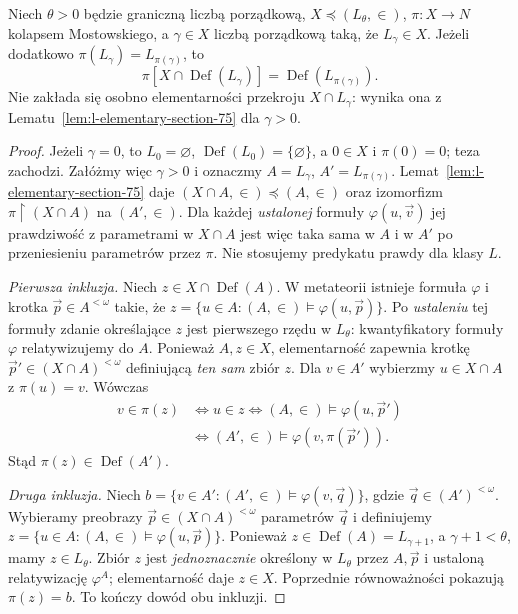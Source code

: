 \begin{lemat}
\label{lem:l-collapse-def-compatibility}
Niech $\theta>0$ będzie graniczną liczbą porządkową,
$X\preccurlyeq(L_\theta,\in)$,
$\pi:X\to N$ kolapsem Mostowskiego, a $\gamma\in X$
liczbą porządkową taką, że $L_\gamma\in X$.
Jeżeli dodatkowo
$\pi(L_\gamma)=L_{\pi(\gamma)}$, to
\[
\pi[X\cap\operatorname{Def}(L_\gamma)]
  =\operatorname{Def}(L_{\pi(\gamma)}).
\]
Nie zakłada się osobno elementarności przekroju
$X\cap L_\gamma$: wynika ona z
Lematu~\ref{lem:l-elementary-section-75} dla $\gamma>0$.
\end{lemat}
\begin{proof}
Jeżeli $\gamma=0$, to
$L_0=\varnothing$, $\operatorname{Def}(L_0)=\{\varnothing\}$,
a $0\in X$ i $\pi(0)=0$; teza zachodzi.
Załóżmy więc $\gamma>0$ i oznaczmy
$A=L_\gamma$, $A'=L_{\pi(\gamma)}$.
Lemat~\ref{lem:l-elementary-section-75} daje
$(X\cap A,\in)\preccurlyeq(A,\in)$ oraz izomorfizm
$\pi\restriction(X\cap A)$ na $(A',\in)$.
Dla każdej \emph{ustalonej} formuły $\varphi(u,\vec v)$
jej prawdziwość z parametrami w $X\cap A$ jest więc
taka sama w $A$ i w $A'$ po przeniesieniu parametrów
przez $\pi$. Nie stosujemy predykatu prawdy dla klasy $L$.

\emph{Pierwsza inkluzja.}
Niech $z\in X\cap\operatorname{Def}(A)$.
W metateorii istnieje formuła $\varphi$ i krotka
$\vec p\in A^{<\omega}$ takie, że
$z=\{u\in A:(A,\in)\models\varphi(u,\vec p)\}$.
Po \emph{ustaleniu} tej formuły zdanie określające $z$
jest pierwszego rzędu w $L_\theta$:
kwantyfikatory formuły $\varphi$ relatywizujemy do $A$.
Ponieważ $A,z\in X$, elementarność zapewnia
krotkę $\vec p'\in(X\cap A)^{<\omega}$ definiującą
\emph{ten sam} zbiór $z$.
Dla $v\in A'$ wybierzmy $u\in X\cap A$ z
$\pi(u)=v$. Wówczas
\begin{align*}
 v\in\pi(z)
 &\iff u\in z
 \iff (A,\in)\models\varphi(u,\vec p')\\
 &\iff (A',\in)\models
            \varphi(v,\pi(\vec p')).
\end{align*}
Stąd $\pi(z)\in\operatorname{Def}(A')$.

\emph{Druga inkluzja.}
Niech $b=\{v\in A':(A',\in)\models
\varphi(v,\vec q)\}$, gdzie $\vec q\in(A')^{<\omega}$.
Wybieramy preobrazy $\vec p\in(X\cap A)^{<\omega}$
parametrów $\vec q$ i definiujemy
$z=\{u\in A:(A,\in)\models\varphi(u,\vec p)\}$.
Ponieważ $z\in\operatorname{Def}(A)=L_{\gamma+1}$,
a $\gamma+1<\theta$, mamy $z\in L_\theta$.
Zbiór $z$ jest \emph{jednoznacznie} określony w
$L_\theta$ przez $A,\vec p$ i ustaloną relatywizację
$\varphi^A$; elementarność daje $z\in X$.
Poprzednie równoważności pokazują $\pi(z)=b$.
To kończy dowód obu inkluzji.
\end{proof}


